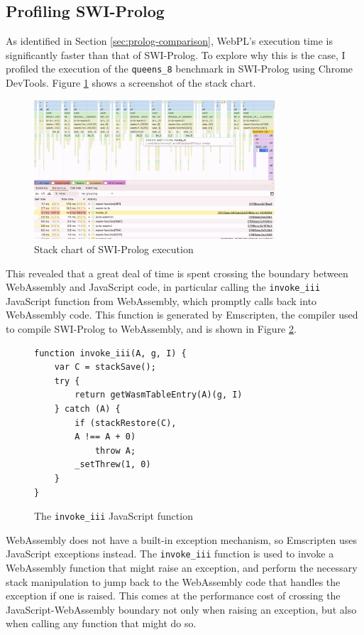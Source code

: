 \subsection{Profiling SWI-Prolog}

As identified in Section \ref{sec:prolog-comparison}, WebPL's execution time is significantly faster than that of SWI-Prolog. To explore why this is the case, I profiled the execution of the \texttt{queens\_8} benchmark in SWI-Prolog using Chrome DevTools. Figure \ref{fig:swi-prolog-profile} shows a screenshot of the stack chart.

\begin{figure}[H]
\centering
\includegraphics[width=0.8\textwidth]{08evaluation_swiprofiling.png}
\caption{Stack chart of SWI-Prolog execution}
\label{fig:swi-prolog-profile}
\end{figure}

This revealed that a great deal of time is spent crossing the boundary between WebAssembly and JavaScript code, in particular calling the \texttt{invoke\_iii} JavaScript function from WebAssembly, which promptly calls back into WebAssembly code. This function is generated by Emscripten, the compiler used to compile SWI-Prolog to WebAssembly, and is shown in Figure \ref{fig:invoke-iii}.

\begin{figure}[H]
\centering
\begin{verbatim}
function invoke_iii(A, g, I) {
    var C = stackSave();
    try {
        return getWasmTableEntry(A)(g, I)
    } catch (A) {
        if (stackRestore(C),
        A !== A + 0)
            throw A;
        _setThrew(1, 0)
    }
}
\end{verbatim}
\caption{The \texttt{invoke\_iii} JavaScript function}
\label{fig:invoke-iii}
\end{figure}

WebAssembly does not have a built-in exception mechanism, so Emscripten uses JavaScript exceptions instead. The \texttt{invoke\_iii} function is used to invoke a WebAssembly function that might raise an exception, and perform the necessary stack manipulation to jump back to the WebAssembly code that handles the exception if one is raised. This comes at the performance cost of crossing the JavaScript-WebAssembly boundary not only when raising an exception, but also when calling any function that might do so.

